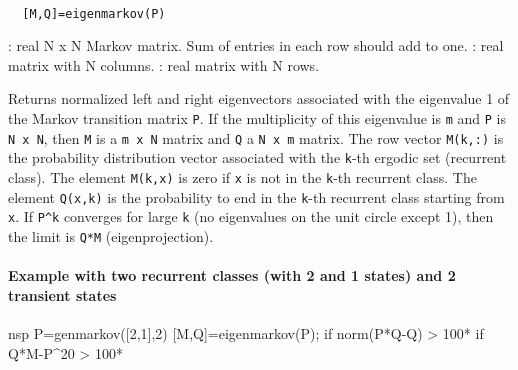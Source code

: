\begin{mandesc}
   \\ %
\end{mandesc}
\begin{calling_sequence}
\begin{verbatim}
  [M,Q]=eigenmarkov(P)  
\end{verbatim}
\end{calling_sequence}
\begin{parameters}
  \begin{varlist}
    : real N x N Markov matrix. Sum of entries in each row should add to one.
    : real matrix with N columns.
    : real matrix with N rows.
  \end{varlist}
\end{parameters}
\begin{mandescription}
  Returns normalized left and right eigenvectors associated with the eigenvalue
  1 of the Markov transition matrix \verb!P!.  If the multiplicity of this
  eigenvalue is \verb!m! and \verb!P!  is \verb!N x N!, then \verb!M! is a
  \verb!m x N! matrix and \verb!Q! a \verb!N x m! matrix.  The row vector
  \verb!M(k,:)! is the probability distribution vector associated with the
  \verb!k!-th ergodic set (recurrent class). The element \verb!M(k,x)! is zero
  if \verb!x! is not in the \verb!k!-th recurrent class.  The element
  \verb!Q(x,k)! is the probability to end in the \verb!k!-th recurrent class
  starting from \verb!x!. If \verb!P^k! converges for large \verb!k! (no
  eigenvalues on the unit circle except 1), then the limit is \verb!Q*M!
  (eigenprojection).
\end{mandescription}
\begin{examples}
  \paragraph{Example with two recurrent classes (with 2 and 1 states) and 2 transient states}
  \begin{mintednsp}{nsp}
    P=genmarkov([2,1],2) 
    [M,Q]=eigenmarkov(P);
    if norm(P*Q-Q) > 100*%
    if Q*M-P^20 > 100*%
  \end{mintednsp}
\end{examples}
\begin{manseealso}
     
\end{manseealso}


